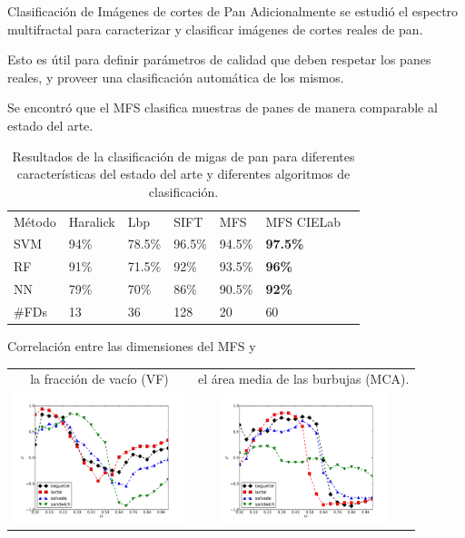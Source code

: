 \documentclass[spanish]{beamer}
\begin{document}
\begin{frame}{Clasificación de Imágenes de cortes de Pan}
Adicionalmente se estudió el espectro multifractal para caracterizar y clasificar imágenes de cortes reales de pan.

Esto es útil para definir parámetros de calidad que deben respetar los panes reales, y proveer una clasificación automática de los mismos.

Se encontró que el MFS clasifica muestras de panes de manera comparable al estado del arte.

\end{frame}

\begin{frame}
\begin{table}[h!]
\center
\begin{tabular}{lllllll}
\hline\noalign{\smallskip}
Método & Haralick & Lbp & SIFT & MFS & MFS CIELab\\ %
\noalign{\smallskip}\hline\noalign{\smallskip}
SVM & 94\% & 78.5\% & 96.5\% & 94.5\% & \textbf{97.5\%} \\
RF  & 91\% & 71.5\% & 92\% & 93.5\% & \textbf{96\%} \\
NN & 79\% & 70\% & 86\%  & 90.5\% & \textbf{92\%} \\
\noalign{\smallskip}\hline
\#FDs & 13 & 36 & 128 & 20 & 60\\
\hline
\end{tabular}
\caption{Resultados de la clasificación de migas de pan para diferentes características del estado del arte y diferentes algoritmos de clasificación.}
\label{tab:other} 
\end{table}
\end{frame}

\begin{frame}
Correlación entre las dimensiones del MFS y \\

\vspace{1cm}

\begin{tabular}{cc}
la fracción de vacío (VF) & el área media de las burbujas (MCA). \\
\includegraphics[width=5cm]{../figures/VF} & \includegraphics[width=5cm]{../figures/MCA} \\
\end{tabular}

\end{frame}
\end{document}

